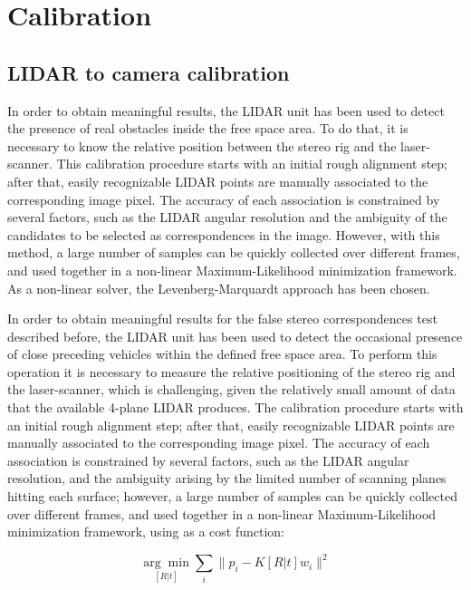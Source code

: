 \section{Calibration}\label{ch:chapter03_02}

\subsection{LIDAR to camera calibration}\label{ch:chapter03_02_01}

In order to obtain meaningful results, the LIDAR unit has been used to detect the presence of real obstacles inside the free space area. To do that, it is necessary to know the relative position between the stereo rig and the laser-scanner. This calibration procedure starts with an initial rough alignment step; after that, easily recognizable LIDAR points are manually associated to the corresponding image pixel. The accuracy of each association is constrained by several factors, such as the LIDAR angular resolution and the ambiguity of the candidates to be selected as correspondences in the image. However, with this method, a large number of samples can be quickly collected over different frames, and used together in a non-linear Maximum-Likelihood minimization framework. As a non-linear solver, the Levenberg-Marquardt approach has been chosen.

In order to obtain meaningful results for the false stereo correspondences test described before, the LIDAR unit has been used to detect the occasional presence of close preceding vehicles within the defined free space area. To perform this operation it is necessary to measure the relative positioning of the stereo rig and the laser-scanner, which is challenging, given the relatively small amount of data that the available 4-plane LIDAR produces.
The calibration procedure starts with an initial rough alignment step; after that, easily recognizable LIDAR points are manually associated to the corresponding image pixel. The accuracy of each association is constrained by several factors, such as the LIDAR angular resolution, and the ambiguity arising by the limited number of scanning planes hitting each surface; however, a large number of samples can be quickly collected over different frames, and used together in a non-linear Maximum-Likelihood minimization framework, using as a cost function:

\begin{equation}\label{eq:cp03_ML}
\underset{[R|t]}{\arg\min} \sum_{i} \lVert p_i - K[R|t] w_i \rVert^2
\end{equation}

